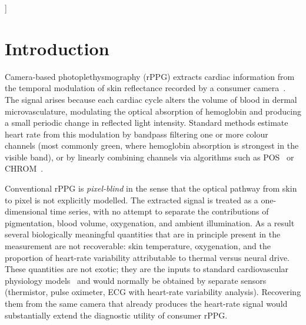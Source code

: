 \documentclass[10pt,twocolumn,a4paper]{article}
\theoremstyle{definition}
\newcommand{\Qten}{Q_{10}}
\begin{document}
\begin{@twocolumnfalse}
\begin{abstract}
\vspace{4pt}
\noindent\textbf{Keywords:} remote photoplethysmography, rPPG, skin optics,
Beer--Lambert, hemoglobin, vasodilation, skin temperature, heart rate
decomposition, $\Qten$~metabolic effect, multi-channel inversion,
camera-based vital sensing.
\end{abstract}
\vspace{12pt}
\end{@twocolumnfalse}
]

\section{Introduction}

Camera-based photoplethysmography (rPPG) extracts cardiac information
from the temporal modulation of skin reflectance recorded by a
consumer camera~\cite{verkruysse2008,allen2007,mcduff2015}. The
signal arises because each cardiac cycle alters the volume of blood in
dermal microvasculature, modulating the optical absorption of
hemoglobin and producing a small periodic change in reflected light
intensity. Standard methods estimate heart rate from this
modulation by bandpass filtering one or more colour channels (most
commonly green, where hemoglobin absorption is strongest in the
visible band), or by linearly combining channels via algorithms such
as POS~\cite{wang2017posrPPG} or
CHROM~\cite{dehaan2013chrom}.

Conventional rPPG is \emph{pixel-blind} in the sense that the
optical pathway from skin to pixel is not explicitly modelled. The
extracted signal is treated as a one-dimensional time series, with no
attempt to separate the contributions of pigmentation, blood volume,
oxygenation, and ambient illumination. As a result several
biologically meaningful quantities that are in principle present in
the measurement are not recoverable: skin temperature, oxygenation,
and the proportion of heart-rate variability attributable to thermal
versus neural drive. These quantities are not exotic; they are the
inputs to standard cardiovascular physiology
models~\cite{guyton2006,levick2009} and would normally be obtained by
separate sensors (thermistor, pulse oximeter, ECG with heart-rate
variability analysis). Recovering them from the same camera that
already produces the heart-rate signal would substantially extend the
diagnostic utility of consumer rPPG.
\end{document}
